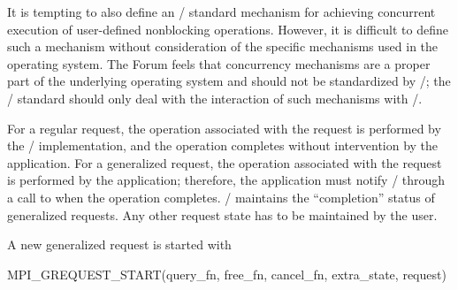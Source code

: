 \begin{rationale}
It is tempting to also define an \MPI/ standard mechanism for
achieving concurrent execution of
user-defined nonblocking operations.  
However, it is difficult to define such a mechanism without
consideration of the specific mechanisms used in the operating system.
The Forum feels that concurrency mechanisms are a proper part
of the underlying operating system and should not be standardized by
\MPI/; the \MPI/ standard should only deal with the interaction of
such mechanisms with \MPI/.
\end{rationale}

For a regular request, the operation associated with the request is
performed by the \MPI/ implementation, and the operation
completes without intervention by the application.  For a generalized
request, the operation associated with the request is performed by the
application; therefore, the application must notify \MPI/ 
through a call to  when the
operation completes.
\MPI/ maintains the ``completion'' status of generalized requests.  Any
other request state has to be maintained by the user. 
 
A new generalized request is started with

%
\begin{funcdef}{MPI\_GREQUEST\_START}{(\mbox{query\_fn}, \mbox{free\_fn}, \mbox{cancel\_fn}, \mbox{extra\_state}, \mbox{request})}
\end{funcdef}
%
%
%
%
%
%

